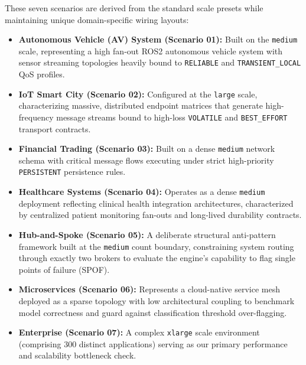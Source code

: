 \documentclass[sigconf,9pt,anonymous]{acmart}
\begin{document}
These seven scenarios are derived from the standard scale presets while maintaining unique domain-specific wiring layouts:
\begin{itemize}
    \item \textbf{Autonomous Vehicle (AV) System (Scenario 01):} Built on the \texttt{medium} scale, representing a high fan-out ROS2 autonomous vehicle system with sensor streaming topologies heavily bound to \texttt{RELIABLE} and \texttt{TRANSIENT\_LOCAL} QoS profiles.
    \item \textbf{IoT Smart City (Scenario 02):} Configured at the \texttt{large} scale, characterizing massive, distributed endpoint matrices that generate high-frequency message streams bound to high-loss \texttt{VOLATILE} and \texttt{BEST\_EFFORT} transport contracts.
    \item \textbf{Financial Trading (Scenario 03):} Built on a dense \texttt{medium} network schema with critical message flows executing under strict high-priority \texttt{PERSISTENT} persistence rules.
    \item \textbf{Healthcare Systems (Scenario 04):} Operates as a dense \texttt{medium} deployment reflecting clinical health integration architectures, characterized by centralized patient monitoring fan-outs and long-lived durability contracts.
    \item \textbf{Hub-and-Spoke (Scenario 05):} A deliberate structural anti-pattern framework built at the \texttt{medium} count boundary, constraining system routing through exactly two brokers to evaluate the engine's capability to flag single points of failure (SPOF).
    \item \textbf{Microservices (Scenario 06):} Represents a cloud-native service mesh deployed as a sparse topology with low architectural coupling to benchmark model correctness and guard against classification threshold over-flagging.
    \item \textbf{Enterprise (Scenario 07):} A complex \texttt{xlarge} scale environment (comprising 300 distinct applications) serving as our primary performance and scalability bottleneck check.
\end{itemize}
\end{document}
